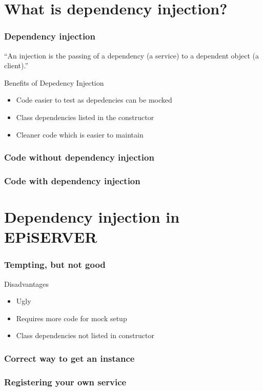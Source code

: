 \documentclass{beamer}
\begin{document}
	\section{What is dependency injection?}
		\begin{frame}
			\frametitle{Dependency injection} \pause
			\begin{exampleblock}{}
				{\large ``An injection is the passing of a dependency (a service) to a dependent object (a client).''}
				\vskip5mm
				\hspace*{} \pause
			\end{exampleblock}
			\begin{exampleblock}{Benefits of Depedency Injection} \pause
				\begin{itemize}
					\item Code easier to test as depedencies can be mocked \pause
					\item Class dependencies listed in the constructor \pause
					\item Cleaner code which is easier to maintain
				\end{itemize}
			\end{exampleblock}
		\end{frame}
		\begin{frame}
			\frametitle{Code without dependency injection}
			
		\end{frame}
		\begin{frame}
			\frametitle{Code with dependency injection}
			
		\end{frame}

	\section{Dependency injection in EPiSERVER}
		\begin{frame}
			\frametitle{Tempting, but not good}
			 \pause
			\begin{exampleblock}{Disadvantages} \pause
				\begin{itemize}
					\item Ugly \pause
					\item Requires more code for mock setup \pause
					\item Class dependencies not listed in constructor
				\end{itemize}
			\end{exampleblock}
		\end{frame}
		\begin{frame}
			\frametitle{Correct way to get an instance}
			
		\end{frame}
		\begin{frame}
			\frametitle{Registering your own service}
			
		\end{frame}
\end{document}
